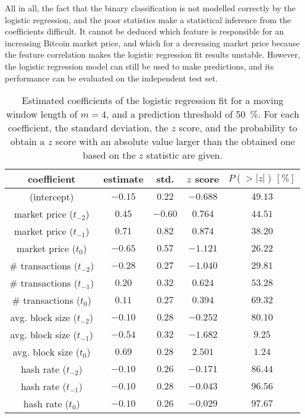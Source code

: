 All in all, the fact that the binary classification is not modelled correctly by the logistic regression, and the poor statistics make a statistical inference from the coefficients difficult. It cannot be deduced which feature is responsible for an increasing Bitcoin market price, and which for a decreasing market price because the feature correlation makes the logistic regression fit results unstable. However, the logistic regression model can still be used to make predictions, and its performance can be evaluated on the independent test set.

\begin{table}[h!]
\centering
\begin{tabular}{c||c|c|c|c}
coefficient & estimate & std. & $z$ score & $P(>|z|)\,[\%]$ \\
 \hline
 \hline
(intercept) & $-0.15$ & $0.22$ & $-0.688$ & $49.13$ \\  
 \hline
 market price ($t_{-2}$) & $0.45$ & $-0.60$ & $0.764$ & $44.51$\\   
 \hline
market price ($t_{-1}$) & $0.71$ & $0.82$ & $0.874$ & $38.20$\\
\hline
market price ($t_{0}$) & $-0.65$ & $0.57$ & $-1.121$ & $26.22$\\
\hline
\# transactions ($t_{-2}$) & $-0.28$ & $0.27$ & $-1.040$ & $29.81$\\
\hline
\# transactions ($t_{-1}$) & $0.20$ & $0.32$ & $0.624$ & $53.28$\\
\hline
\# transactions ($t_{0}$) & $0.11$ & $0.27$ & $0.394$ & $69.32$\\
\hline
avg. block size ($t_{-2}$) & $-0.10$ & $0.28$ & $-0.252$ & $80.10$\\
\hline
avg. block size ($t_{-1}$) & $-0.54$ & $0.32$ & $-1.682$ & $9.25$\\
\hline
avg. block size ($t_{0}$) & $0.69$ & $0.28$ & $2.501$ & $1.24$\\
\hline
hash rate ($t_{-2}$) & $-0.10$ & $0.26$ & $-0.171$ & $86.44$\\
\hline
hash rate ($t_{-1}$) & $-0.10$ & $0.28$ & $-0.043$ & $96.56$\\
\hline
hash rate ($t_{0}$) & $-0.10$ & $0.26$ & $-0.029$ & $97.67$\\
\end{tabular}
 \caption{Estimated coefficients of the logistic regression fit for a moving window length of $m=4$, and a prediction threshold of \SI{50}{\percent}. For each coefficient, the standard deviation, the $z$ score, and the probability to obtain a $z$ score with an absolute value larger than the obtained one based on the $z$ statistic are given.}
 \label{tab:log_coef}
\end{table}


